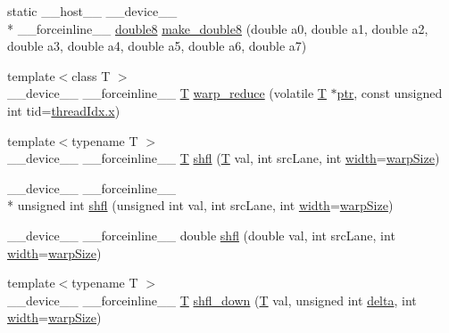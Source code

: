 \begin{DoxyCompactItemize}
\item 
static \-\_\-\-\_\-host\-\_\-\-\_\- \-\_\-\-\_\-device\-\_\-\-\_\- \\*
\-\_\-\-\_\-forceinline\-\_\-\-\_\- \hyperlink{structcv_1_1gpu_1_1device_1_1double8}{double8} \hyperlink{namespacecv_1_1gpu_1_1device_a2aa4965b0bdf19af3f595f634621f069}{make\-\_\-double8} (double a0, double a1, double a2, double a3, double a4, double a5, double a6, double a7)
\item 
{\footnotesize template$<$class T $>$ }\\\-\_\-\-\_\-device\-\_\-\-\_\- \-\_\-\-\_\-forceinline\-\_\-\-\_\- \hyperlink{calib3d_8hpp_a3efb9551a871ddd0463079a808916717}{T} \hyperlink{namespacecv_1_1gpu_1_1device_a467a24c2147f6d9e3eff7439a81fb442}{warp\-\_\-reduce} (volatile \hyperlink{calib3d_8hpp_a3efb9551a871ddd0463079a808916717}{T} $\ast$\hyperlink{core__c_8h_a166529da793cc1ef241cff347f3db5a5}{ptr}, const unsigned int tid=\hyperlink{core__c_8h_ad0da36b2558901e21e7a30f6c227a45e}{thread\-Idx.\-x})
\item 
{\footnotesize template$<$typename T $>$ }\\\-\_\-\-\_\-device\-\_\-\-\_\- \-\_\-\-\_\-forceinline\-\_\-\-\_\- \hyperlink{calib3d_8hpp_a3efb9551a871ddd0463079a808916717}{T} \hyperlink{namespacecv_1_1gpu_1_1device_a6e9bd055d97912e380bb6ca75a46f40c}{shfl} (\hyperlink{calib3d_8hpp_a3efb9551a871ddd0463079a808916717}{T} val, int src\-Lane, int \hyperlink{highgui__c_8h_a2474a5474cbff19523a51eb1de01cda4}{width}=\hyperlink{legacy_8hpp_aa80dc9d8702386dac7fbb06311306e4f}{warp\-Size})
\item 
\-\_\-\-\_\-device\-\_\-\-\_\- \-\_\-\-\_\-forceinline\-\_\-\-\_\- \\*
unsigned int \hyperlink{namespacecv_1_1gpu_1_1device_a43cfb7f5833260834cd9ed0e4533f4f8}{shfl} (unsigned int val, int src\-Lane, int \hyperlink{highgui__c_8h_a2474a5474cbff19523a51eb1de01cda4}{width}=\hyperlink{legacy_8hpp_aa80dc9d8702386dac7fbb06311306e4f}{warp\-Size})
\item 
\-\_\-\-\_\-device\-\_\-\-\_\- \-\_\-\-\_\-forceinline\-\_\-\-\_\- double \hyperlink{namespacecv_1_1gpu_1_1device_aaec42551ac42d08e6ec621312416bad3}{shfl} (double val, int src\-Lane, int \hyperlink{highgui__c_8h_a2474a5474cbff19523a51eb1de01cda4}{width}=\hyperlink{legacy_8hpp_aa80dc9d8702386dac7fbb06311306e4f}{warp\-Size})
\item 
{\footnotesize template$<$typename T $>$ }\\\-\_\-\-\_\-device\-\_\-\-\_\- \-\_\-\-\_\-forceinline\-\_\-\-\_\- \hyperlink{calib3d_8hpp_a3efb9551a871ddd0463079a808916717}{T} \hyperlink{namespacecv_1_1gpu_1_1device_a9036877715cb1db89bf387b835582333}{shfl\-\_\-down} (\hyperlink{calib3d_8hpp_a3efb9551a871ddd0463079a808916717}{T} val, unsigned int \hyperlink{legacy_8hpp_ac867054f00f4be8b1f3ebce6fba31982}{delta}, int \hyperlink{highgui__c_8h_a2474a5474cbff19523a51eb1de01cda4}{width}=\hyperlink{legacy_8hpp_aa80dc9d8702386dac7fbb06311306e4f}{warp\-Size})

\end{DoxyCompactItemize}
